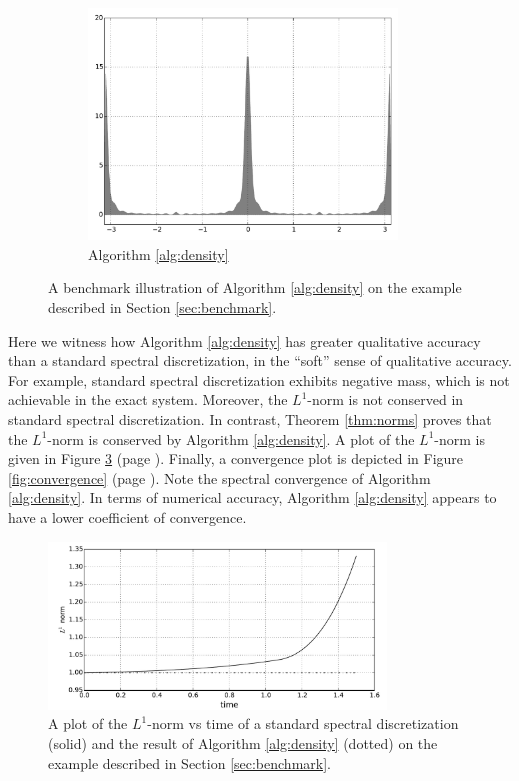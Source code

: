 \documentclass[final,leqno]{siamart}
\begin{document}
\begin{figure}[p]
\begin{subfigure}{0.36\textwidth}
		\includegraphics[width=0.9\textwidth]{./images/gn_spectral_1D.pdf}
		\caption{Algorithm \ref{alg:density}}
		\label{fig:gn spectral}
	\end{subfigure}
	\caption{A benchmark illustration of Algorithm \ref{alg:density} on the example described in Section \ref{sec:benchmark}.}
	\label{fig:S1}
\end{figure}

Here we witness how Algorithm \ref{alg:density} has greater qualitative accuracy than a standard spectral discretization, in the ``soft'' sense of qualitative accuracy.
For example, standard spectral discretization exhibits negative mass, which is not achievable in the exact system.
Moreover, the $L^{1}$-norm is not conserved in standard spectral discretization.  
In contrast, Theorem \ref{thm:norms} proves that the $L^{1}$-norm is conserved by Algorithm \ref{alg:density}.
A plot of the $L^{1}$-norm is given in Figure \ref{fig:L1} (page \pageref{fig:L1}).
Finally, a convergence plot is depicted in Figure \ref{fig:convergence} (page \pageref{fig:convergence}).  
Note the spectral convergence of Algorithm \ref{alg:density}.
In terms of numerical accuracy, Algorithm \ref{alg:density} appears to have a lower coefficient of convergence.

\begin{figure}[p]
	\hspace*{-1.2cm}
	\centering
	\includegraphics[width=0.8\textwidth]{./images/L1_plot.pdf}
	\caption{A plot of the $L^{1}$-norm vs time of a standard spectral discretization (solid) and the result of Algorithm \ref{alg:density} (dotted) on the example described in Section \ref{sec:benchmark}.}
	\label{fig:L1}
\end{figure}
\end{document}
